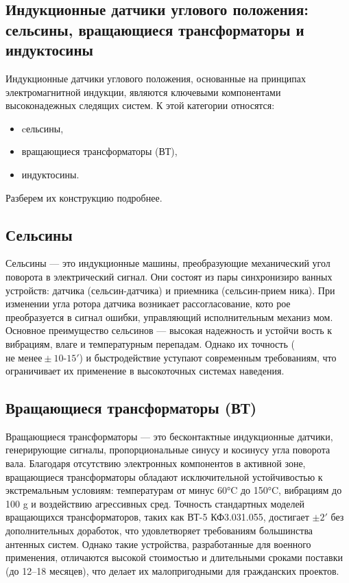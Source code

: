 \subsection{Индукционные датчики углового положения: сельсины, вращающиеся трансформаторы и индуктосины}

Индукционные датчики углового положения, основанные на принципах электромагнитной индукции, являются ключевыми компонентами высоконадежных следящих систем. 
К этой категории относятся: 
\begin{itemize} 
  \item cельсины, 
  \item вращающиеся трансформаторы (ВТ), 
  \item индуктосины. 
\end{itemize}

Разберем их конструкцию подробнее.

\subsection{Сельсины}
Сельсины — это индукционные машины, преобразующие механический
угол поворота в электрический сигнал. Они состоят из пары синхронизиро­
ванных устройств: датчика (сельсин-датчика) и приемника (сельсин-прием­
ника). При изменении угла ротора датчика возникает рассогласование, кото­
рое преобразуется в сигнал ошибки, управляющий исполнительным механиз­
мом. Основное преимущество сельсинов — высокая надежность и устойчи­
вость к вибрациям, влаге и температурным перепадам. Однако их точность ($ \text{не менее}\pm 10 \text{-} 15'$) 
и быстродействие уступают современным требованиям, что ограничивает их применение в высокоточных системах наведения.

\subsection{Вращающиеся трансформаторы (ВТ)}

Вращающиеся трансформаторы — это бесконтактные индукционные датчики, генерирующие сигналы, пропорциональные синусу и косинусу угла поворота вала. 
Благодаря отсутствию электронных компонентов в активной зоне, вращающиеся трансформаторы обладают исключительной устойчивостью к экстремальным условиям: 
температурам от минус 60°C до 150°C, 
вибрациям до 100 g и воздействию агрессивных сред.
Точность стандартных моделей вращающихся трансформаторов, таких как ВТ-5 КФ3.031.055, достигает $ \pm 2'$ без дополнительных доработок, 
что удовлетворяет требованиям большинства антенных систем. 
Однако такие устройства, разработанные для военного применения, отличаются высокой стоимостью и длительными сроками поставки (до 12–18 месяцев), 
что делает их малопригодными для гражданских проектов.

